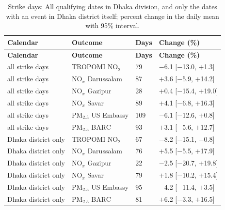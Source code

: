\begingroup\footnotesize
\begin{longtable}{L{3.6cm} L{4.0cm} C{1.4cm} C{3.2cm}}
\caption{Strike days: All qualifying dates in Dhaka division, and only the dates with an event in Dhaka district itself; percent change in the daily mean with 95\% interval.}\label{tab:s-strikes}\\
\toprule
\textbf{Calendar} & \textbf{Outcome} & \textbf{Days} & \textbf{Change (\%)} \\
\midrule\endfirsthead
\toprule
\textbf{Calendar} & \textbf{Outcome} & \textbf{Days} & \textbf{Change (\%)} \\
\midrule\endhead
\bottomrule\endfoot
all strike days & TROPOMI NO$_2$ & 79 & $-$6.1 {\scriptsize[$-$13.0, $+$1.3]} \\
all strike days & NO$_x$ Darussalam & 87 & $+$3.6 {\scriptsize[$-$5.9, $+$14.2]} \\
all strike days & NO$_x$ Gazipur & 28 & $+$0.4 {\scriptsize[$-$15.4, $+$19.0]} \\
all strike days & NO$_x$ Savar & 89 & $+$4.1 {\scriptsize[$-$6.8, $+$16.3]} \\
all strike days & PM$_{2.5}$ US Embassy & 109 & $-$6.1 {\scriptsize[$-$12.6, $+$0.8]} \\
all strike days & PM$_{2.5}$ BARC & 93 & $+$3.1 {\scriptsize[$-$5.6, $+$12.7]} \\
Dhaka district only & TROPOMI NO$_2$ & 67 & $-$8.2 {\scriptsize[$-$15.1, $-$0.8]} \\
Dhaka district only & NO$_x$ Darussalam & 76 & $+$5.5 {\scriptsize[$-$5.5, $+$17.9]} \\
Dhaka district only & NO$_x$ Gazipur & 22 & $-$2.5 {\scriptsize[$-$20.7, $+$19.8]} \\
Dhaka district only & NO$_x$ Savar & 79 & $+$1.8 {\scriptsize[$-$10.2, $+$15.4]} \\
Dhaka district only & PM$_{2.5}$ US Embassy & 95 & $-$4.2 {\scriptsize[$-$11.4, $+$3.5]} \\
Dhaka district only & PM$_{2.5}$ BARC & 81 & $+$6.2 {\scriptsize[$-$3.3, $+$16.5]} \\
\end{longtable}
\endgroup
